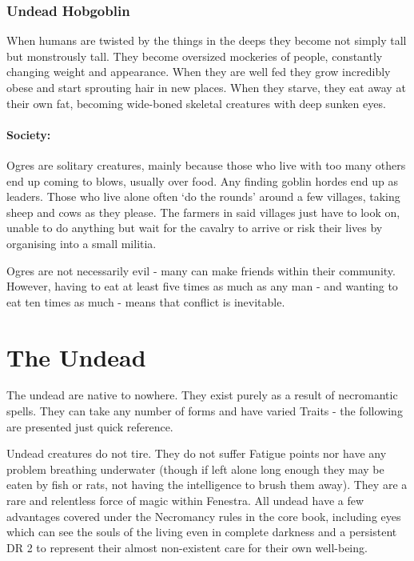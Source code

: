 \subsubsection{Undead Hobgoblin}

\undeadhobgoblin


\label{ogre}
\ogre


When humans are twisted by the things in the deeps they become not simply tall but monstrously tall.  They become oversized mockeries of people, constantly changing weight and appearance.  When they are well fed they grow incredibly obese and start sprouting hair in new places.  When they starve, they eat away at their own fat, becoming wide-boned skeletal creatures with deep sunken eyes.

\paragraph{Society:} Ogres are solitary creatures, mainly because those who live with too many others end up coming to blows, usually over food.  Any finding goblin hordes end up as leaders.  Those who live alone often `do the rounds' around a few villages, taking sheep and cows as they please.  The farmers in said villages just have to look on, unable to do anything but wait for the cavalry to arrive or risk their lives by organising into a small militia.

	Ogres are not necessarily evil - many can make friends within their community.  However, having to eat at least five times as much as any man - and wanting to eat ten times as much - means that conflict is inevitable.

\section{The Undead}

The undead are native to nowhere.  They exist purely as a result of necromantic spells.  They can take any number of forms and have varied Traits - the following are presented just quick reference.

Undead creatures do not tire.  They do not suffer Fatigue points nor have any problem breathing underwater (though if left alone long enough they may be eaten by fish or rats, not having the intelligence to brush them away).  They are a rare and relentless force of magic within Fenestra.  All undead have a few advantages covered under the Necromancy rules in the core book, including eyes which can see the souls of the living even in complete darkness and a persistent DR 2 to represent their almost non-existent care for their own well-being.

